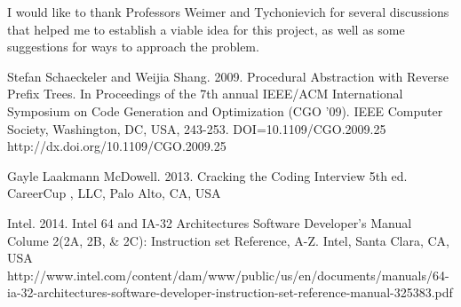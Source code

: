 \documentclass[9pt,nocopyrightspace]{sigplanconf}
\begin{document}
\acks

I would like to thank Professors Weimer and Tychonievich for several discussions that helped me to establish a viable idea for this project, as well as some suggestions for ways to approach the problem.





\begin{thebibliography}{}
\softraggedright

Stefan Schaeckeler and Weijia Shang. 2009. Procedural Abstraction with Reverse Prefix Trees. In Proceedings of the 7th annual IEEE/ACM International Symposium on Code Generation and Optimization (CGO '09). IEEE Computer Society, Washington, DC, USA, 243-253. DOI=10.1109/CGO.2009.25 http://dx.doi.org/10.1109/CGO.2009.25

Gayle Laakmann McDowell. 2013. Cracking the Coding Interview 5th ed. CareerCup , LLC, Palo Alto, CA, USA

Intel. 2014. Intel 64 and IA-32 Architectures Software Developer's Manual Colume 2(2A, 2B, \& 2C): Instruction set Reference, A-Z. Intel, Santa Clara, CA, USA http://www.intel.com/content/dam/www/public/us/en/documents/manuals/64-ia-32-architectures-software-developer-instruction-set-reference-manual-325383.pdf

\end{thebibliography}
\end{document}
